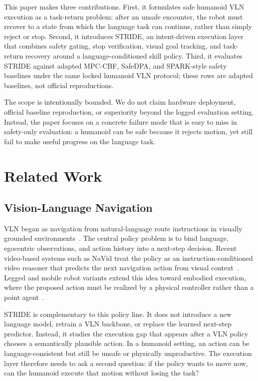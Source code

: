 \documentclass[letterpaper,10pt,conference]{ieeeconf}
\begin{document}
This paper makes three contributions. First, it formulates safe humanoid VLN execution as a task-return problem: after an unsafe encounter, the robot must recover to a state from which the language task can continue, rather than simply reject or stop. Second, it introduces STRIDE, an intent-driven execution layer that combines safety gating, stop verification, visual goal tracking, and task-return recovery around a language-conditioned skill policy. Third, it evaluates STRIDE against adapted MPC-CBF, SafeDPA, and SPARK-style safety baselines under the same locked humanoid VLN protocol; these rows are adapted baselines, not official reproductions.

The scope is intentionally bounded. We do not claim hardware deployment, official baseline reproduction, or superiority beyond the logged evaluation setting. Instead, the paper focuses on a concrete failure mode that is easy to miss in safety-only evaluation: a humanoid can be safe because it rejects motion, yet still fail to make useful progress on the language task.

\section{Related Work}
\subsection{Vision-Language Navigation}
VLN began as navigation from natural-language route instructions in visually grounded environments~\cite{anderson2018r2r}. The central policy problem is to bind language, egocentric observations, and action history into a next-step decision. Recent video-based systems such as NaVid treat the policy as an instruction-conditioned video reasoner that predicts the next navigation action from visual context~\cite{zhang2024navid}. Legged and mobile robot variants extend this idea toward embodied execution, where the proposed action must be realized by a physical controller rather than a point agent~\cite{cheng2024navila}.

STRIDE is complementary to this policy line. It does not introduce a new language model, retrain a VLN backbone, or replace the learned next-step predictor. Instead, it studies the execution gap that appears after a VLN policy chooses a semantically plausible action. In a humanoid setting, an action can be language-consistent but still be unsafe or physically unproductive. The execution layer therefore needs to ask a second question: if the policy wants to move now, can the humanoid execute that motion without losing the task?
\end{document}

